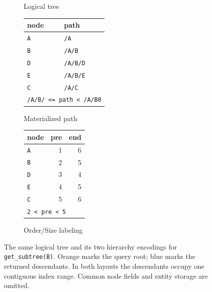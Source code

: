 \documentclass[10pt]{article}
\newcommand{\code}[1]{\texttt{#1}}
\begin{document}
\begin{figure}[H]
\centering
\begin{subfigure}[t]{0.28\linewidth}
\centering
\vspace{0pt}
\caption{Logical tree}
\label{fig:logical-tree}
\end{subfigure}
\hfill
\begin{subfigure}[t]{0.32\linewidth}
\centering
\vspace{0pt}
\footnotesize
\begin{tabular}{@{}ll@{}}
\toprule
node & path \\
\midrule
\code{A} & \code{/A} \\
\rowcolor{rootrow}\code{B} & \code{/A/B} \\
\rowcolor{keyrow}\code{D} & \code{/A/B/D} \\
\rowcolor{keyrow}\code{E} & \code{/A/B/E} \\
\code{C} & \code{/A/C} \\
\bottomrule
\multicolumn{2}{l}{\code{/A/B/ <= path < /A/B0}}
\end{tabular}
\caption{Materialized path}
\label{fig:materialized-path}
\end{subfigure}
\hfill
\begin{subfigure}[t]{0.32\linewidth}
\centering
\vspace{0pt}
\footnotesize
\begin{tabular}{@{}lrr@{}}
\toprule
node & pre & end \\
\midrule
\code{A} & 1 & 6 \\
\rowcolor{rootrow}\code{B} & 2 & 5 \\
\rowcolor{keyrow}\code{D} & 3 & 4 \\
\rowcolor{keyrow}\code{E} & 4 & 5 \\
\code{C} & 5 & 6 \\
\bottomrule
\multicolumn{3}{l}{\code{2 < pre < 5}}
\end{tabular}
\caption{Order/Size labeling}
\label{fig:order-size}
\end{subfigure}
\caption{The same logical tree and its two hierarchy encodings for
\code{get\_subtree(B)}. Orange marks the query root; blue marks the returned
descendants. In both layouts the descendants occupy one contiguous index
range. Common node fields and entity storage are omitted.}
\label{fig:two-layouts}
\end{figure}
\end{document}
